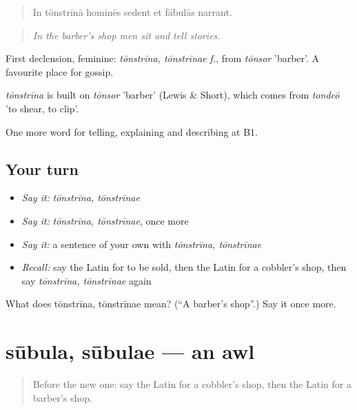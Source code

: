 \begin{quote}
In tōnstrīnā hominēs sedent et fābulās narrant.
\end{quote}

\begin{quote}
\emph{In the barber's shop men sit and tell stories.}
\end{quote}

First declension, feminine: \emph{tōnstrīna, tōnstrīnae f.}, from \emph{tōnsor} 'barber'. A favourite place for gossip.

\begin{cousinweb}
\emph{tōnstrīna} is built on \emph{tōnsor} 'barber' (Lewis \& Short), which comes from \emph{tondeō} 'to shear, to clip'.
\end{cousinweb}

\begin{grammarlens}[title={What you've built}]
One more word for telling, explaining and describing at B1.
\end{grammarlens}

\subsection*{Your turn}
\begin{itemize}
\raggedright
  \item \emph{Say it:} \emph{tōnstrīna, tōnstrīnae}
  \item \emph{Say it:} \emph{tōnstrīna, tōnstrīnae}, once more
  \item \emph{Say it:} a sentence of your own with \emph{tōnstrīna, tōnstrīnae}
  \item \emph{Recall:} say the Latin for to be sold, then the Latin for a cobbler's shop, then say \emph{tōnstrīna, tōnstrīnae} again
\end{itemize}

\begin{tcolorbox}[breakable,colback=teal!4,colframe=teal!35!black,title={Before you move on}]
What does tōnstrīna, tōnstrīnae mean? (\textquotedblleft{}A barber's shop\textquotedblright{}.) Say it once more.
\end{tcolorbox}
\section[sūbula, sūbulae]{sūbula, sūbulae — an awl}

\label{lesson:LA-C467-subula}



\begin{quote}
Before the new one: say the Latin for a cobbler's shop, then the Latin for a barber's shop.
\end{quote}

